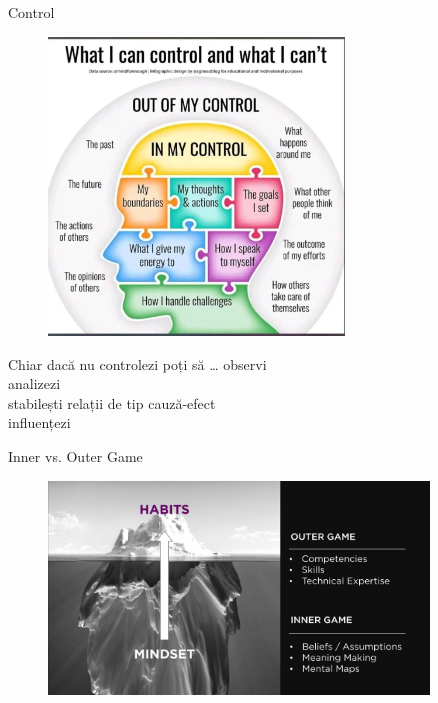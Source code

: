 \documentclass{simple}
\begin{document}
\begin{frame}{Control}
  \begin{figure}
    \centering
    \includegraphics[width=0.7\textwidth]{img/control.jpg}
  \end{figure}
\end{frame}

\begin{frame}{Chiar dacă nu controlezi poți să \ldots{}}
  \centering
  \pause observi \\
  \vspace{3mm}
  \pause analizezi \\
  \vspace{3mm}
  \pause stabilești relații de tip cauză-efect \\
  \vspace{3mm}
  \pause influențezi
\end{frame}

\begin{frame}{Inner vs. Outer Game}
  \begin{figure}
    \centering
    \includegraphics[width=0.9\textwidth]{img/inner-outer-game}
  \end{figure}
\end{frame}
\end{document}
